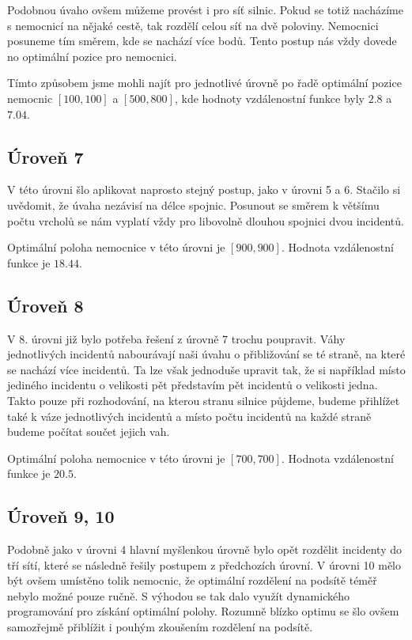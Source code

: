 \documentclass[12pt,a4paper]{article}
\begin{document}
Podobnou úvaho ovšem můžeme provést i pro síť silnic. Pokud se totiž nacházíme s nemocnicí na nějaké cestě, tak rozdělí celou síť na dvě poloviny. Nemocnici posuneme tím směrem, kde se nachází více bodů.
Tento postup nás vždy dovede no optimální pozice pro nemocnici.

Tímto způsobem jsme mohli najít pro jednotlivé úrovně po řadě optimální pozice nemocnic $[100, 100]$ a $[500, 800]$, kde hodnoty vzdálenostní funkce byly $2.8$ a $7.04$.

\subsection*{Úroveň 7}
V této úrovni šlo aplikovat naprosto stejný postup, jako v úrovni 5 a 6. Stačilo si uvědomit, že úvaha nezávisí na délce spojnic. Posunout se směrem k většímu počtu vrcholů se nám vyplatí vždy pro libovolně dlouhou spojnici dvou incidentů.

Optimální poloha nemocnice v této úrovni je $[900, 900]$. Hodnota vzdálenostní funkce je $18.44$. 
\subsection*{Úroveň 8}
V 8. úrovni již bylo potřeba řešení z úrovně 7 trochu poupravit. Váhy jednotlivých incidentů nabourávají naši úvahu o přibližování se té straně, na které se nachází více incidentů.
Ta lze však jednoduše upravit tak, že si například místo jediného incidentu o velikosti pět představím pět incidentů o velikosti jedna. Takto pouze při rozhodování, na kterou stranu silnice půjdeme, budeme přihlížet také k váze jednotlivých incidentů a místo počtu incidentů na každé straně budeme počítat součet jejich vah.

Optimální poloha nemocnice v této úrovni je $[700, 700]$. Hodnota vzdálenostní funkce je $20.5$.

\subsection*{Úroveň 9, 10}
Podobně jako v úrovni 4 hlavní myšlenkou úrovně bylo opět rozdělit incidenty do tří sítí, které se následně řešily postupem z předchozích úrovní. V úrovni 10 mělo být ovšem umístěno tolik nemocnic, že optimální rozdělení na podsítě téměř nebylo možné pouze ručně. S výhodou se tak dalo využít dynamického programování pro získání optimální polohy. Rozumně blízko optimu se šlo ovšem samozřejmě přiblížit i pouhým zkoušením rozdělení na podsítě.
\end{document}
